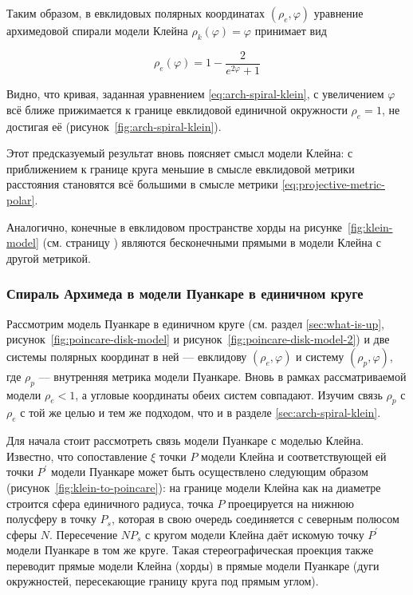 \documentclass{article}
\numberwithin{equation}{section}
\renewcommand{\phi}{\varphi}
\begin{document}
Таким образом, в евклидовых полярных координатах $(\rho_e, \phi)$
уравнение архимедовой спирали модели Клейна $\rho_k(\phi) = \phi$ принимает вид

\begin{equation}\label{eq:arch-spiral-klein}
  \rho_e(\phi) = 1-\frac{2}{e^{2\phi}+1}
\end{equation}



Видно, что кривая, заданная уравнением \eqref{eq:arch-spiral-klein}, с
увеличением $\phi$ всё ближе прижимается к границе евклидовой
единичной окружности $\rho_e=1$, не достигая её
(рисунок \ref{fig:arch-spiral-klein}).

Этот предсказуемый результат вновь поясняет смысл модели Клейна: с
приближением к границе круга меньшие в смысле евклидовой метрики
расстояния становятся всё большими в смысле метрики
\eqref{eq:projective-metric-polar}.

Аналогично, конечные в евклидовом пространстве хорды на
рисунке \ref{fig:klein-model} (см. страницу \pageref{fig:klein-model})
являются бесконечными прямыми в модели Клейна с другой метрикой.

\subsubsection{Спираль Архимеда в модели Пуанкаре в единичном круге}

Рассмотрим модель Пуанкаре в единичном круге (см. раздел
\ref{sec:what-is-up}, рисунок \ref{fig:poincare-disk-model} и
рисунок \ref{fig:poincare-disk-model-2}) и две системы полярных
координат в ней — евклидову $(\rho_e, \phi)$ и систему $(\rho_p,
\phi)$, где $\rho_p$ — внутренняя метрика модели Пуанкаре. Вновь в
рамках рассматриваемой модели $\rho_e<1$, а угловые координаты обеих
систем совпадают. Изучим связь $\rho_p$ с $\rho_e$ с той же целью и
тем же подходом, что и в разделе \ref{sec:arch-spiral-klein}.



Для начала стоит рассмотреть связь модели Пуанкаре с моделью Клейна.
Известно, что сопоставление $\xi$ точки $P$ модели Клейна и
соответствующей ей точки $P^\prime$ модели Пуанкаре может быть
осуществлено следующим образом (рисунок \ref{fig:klein-to-poincare}):
на границе модели Клейна как на диаметре строится сфера единичного
радиуса, точка $P$ проецируется на нижнюю полусферу в точку $P_s$,
которая в свою очередь соединяется с северным полюсом сферы $N$.
Пересечение $NP_s$ с кругом модели Клейна даёт искомую точку
$P^\prime$ модели Пуанкаре в том же круге. Такая стереографическая
проекция также переводит прямые модели Клейна (хорды) в прямые модели
Пуанкаре (дуги окружностей, пересекающие границу круга под прямым
углом).
\end{document}
